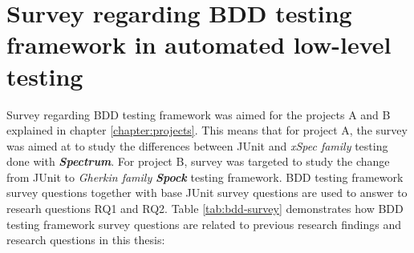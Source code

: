     \vspace{20px}
    \begin{table}[H]
            \caption {NPS questions of developer loyalty towards low-level automated testing with JUnit} \label{tab:junit-pt3}

    \end{table}
    \clearpage
\restoregeometry






\section{Survey regarding BDD testing framework in automated low-level testing}
\label{section:bdd-survey}
Survey regarding BDD testing framework was aimed for the projects A and B explained in chapter \ref{chapter:projects}. This means
that for project A, the survey was aimed at to study the differences between JUnit and \textit{xSpec family} testing done with \textbf{\textit{Spectrum}}.
For project B, survey was targeted to study the change from JUnit to \textit{Gherkin family} \textbf{\textit{Spock}} testing framework.
BDD testing framework survey questions together with base JUnit survey questions are used to answer to researh questions
RQ1 and RQ2. Table \ref{tab:bdd-survey} demonstrates how BDD testing framework survey questions are related to previous research findings
and research questions in this thesis:


